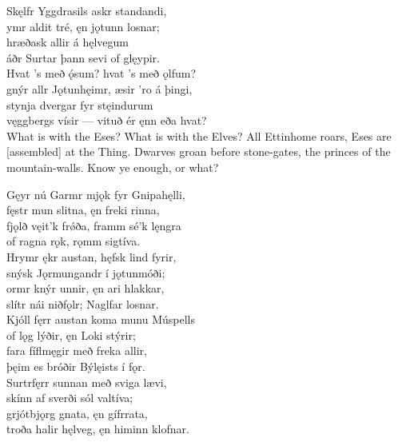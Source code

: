\bva Skęlfr Yggdrasils \hld askr standandi, \\%
ymr aldit tré, \hld ęn jǫtunn losnar; \\%
hræðask allir \hld á hęlvegum \\%
áðr Surtar þann \hld sevi of glęypir.\\%

\bva Hvat ’s með ǫ́sum? \hld hvat ’s með ǫlfum? \\%
gnýr allr Jǫtunhęimr, \hld æsir ’ro á þingi, \\%
stynja dvergar \hld fyr stęindurum \\%
vęggbergs vísir — \hld vituð ér ęnn eða hvat?\\%

\bvb What is with the Eses? What is with the Elves? All Ettinhome roars, Eses are [assembled] at the Thing. Dwarves groan before stone-gates, the princes of the mountain-walls. Know ye enough, or what?

\bva Gęyr nú Garmr mjǫk \hld fyr Gnipahęlli, \\%
fęstr mun slitna, \hld ęn freki rinna, \\%
fjǫlð vęit'k frǿða, \hld framm sé'k lęngra \\%
of ragna rǫk, \hld rǫmm sigtíva.\\%

\bva Hrymr ękr austan, \hld hęfsk lind fyrir, \\%
snýsk Jǫrmungandr \hld í jǫtunmóði; \\%
ormr knýr unnir, \hld ęn ari hlakkar, \\%
slítr nái niðfǫlr; \hld Naglfar losnar.\\%

\bva Kjóll fęrr austan \hld koma munu Múspells \\%
of lǫg lýðir, \hld ęn Loki stýrir; \\%
fara fíflmęgir \hld með freka allir, \\%
þęim es bróðir \hld Býlęists í fǫr.\\%

\bva Surtr\footnotemark[19] fęrr sunnan \hld með sviga lævi, \\%
skínn af sverði \hld sól valtíva; \\%
grjótbjǫrg gnata, \hld ęn gífr\footnotemark[20] rata, \\%
troða halir hęlveg, \hld ęn himinn klofnar.
\\%

